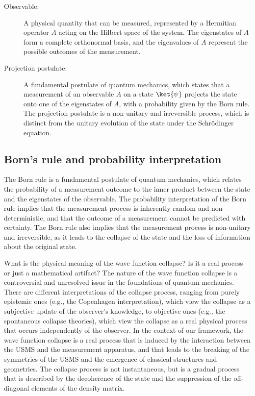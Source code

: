 \begin{tcolorbox}[colback=blue!5!white,colframe=blue!75!black,title=New terms]
\begin{description}
\item[Observable:] A physical quantity that can be measured, represented by a Hermitian operator $A$ acting on the Hilbert space of the system. The eigenstates of $A$ form a complete orthonormal basis, and the eigenvalues of $A$ represent the possible outcomes of the measurement.
\item[Projection postulate:] A fundamental postulate of quantum mechanics, which states that a measurement of an observable $A$ on a state $\ket{\psi}$ projects the state onto one of the eigenstates of $A$, with a probability given by the Born rule. The projection postulate is a non-unitary and irreversible process, which is distinct from the unitary evolution of the state under the Schrödinger equation.
\end{description}
\end{tcolorbox}

\subsection{Born's rule and probability interpretation}
The Born rule is a fundamental postulate of quantum mechanics, which relates the probability of a measurement outcome to the inner product between the state and the eigenstates of the observable. The probability interpretation of the Born rule implies that the measurement process is inherently random and non-deterministic, and that the outcome of a measurement cannot be predicted with certainty. The Born rule also implies that the measurement process is non-unitary and irreversible, as it leads to the collapse of the state and the loss of information about the original state.

\begin{tcolorbox}[colback=green!5!white,colframe=green!75!black,title=Question]
What is the physical meaning of the wave function collapse? Is it a real process or just a mathematical artifact?
\tcblower
The nature of the wave function collapse is a controversial and unresolved issue in the foundations of quantum mechanics. There are different interpretations of the collapse process, ranging from purely epistemic ones (e.g., the Copenhagen interpretation), which view the collapse as a subjective update of the observer's knowledge, to objective ones (e.g., the spontaneous collapse theories), which view the collapse as a real physical process that occurs independently of the observer. In the context of our framework, the wave function collapse is a real process that is induced by the interaction between the USMS and the measurement apparatus, and that leads to the breaking of the symmetries of the USMS and the emergence of classical structures and geometries. The collapse process is not instantaneous, but is a gradual process that is described by the decoherence of the state and the suppression of the off-diagonal elements of the density matrix.
\end{tcolorbox}

